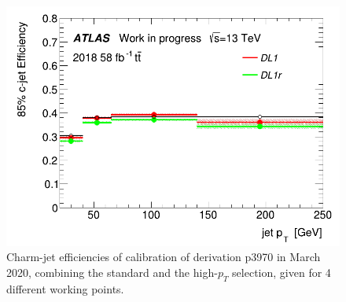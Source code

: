 \documentclass[letterpaper,12pt]{article}
\begin{document}
\begin{figure}[H]
\begin{minipage}[b]{.45\textwidth}
\end{minipage}\hfill
\begin{minipage}[b]{.45\textwidth}
\centering
\includegraphics[width=1\textwidth]{March_highpT/eff85.png}
\end{minipage}
\caption{Charm-jet efficiencies of calibration of derivation p3970 in March 2020, combining the standard 
and the high-$p_{T}$ selection, given for  4 different working points.} \label{fig:March_highpT_eff}
\end{figure}
\end{document}
